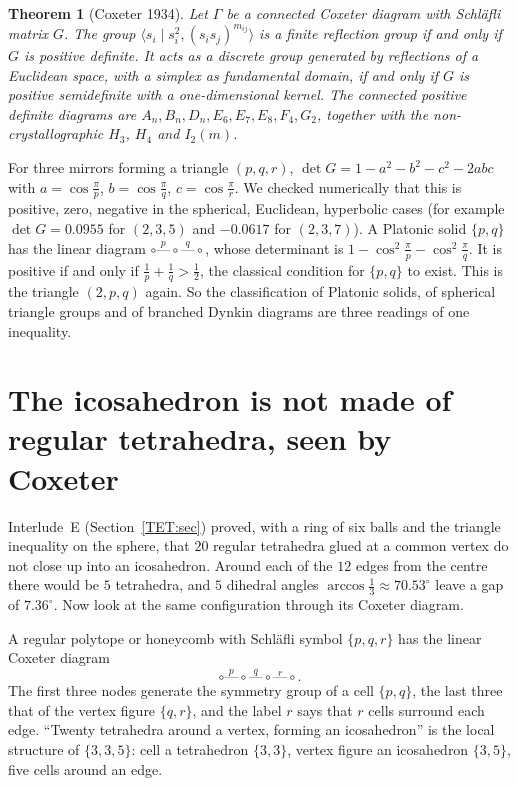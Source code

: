 \documentclass[11pt,openany]{book}
\theoremstyle{plain}
\newtheorem{theorem}{Theorem}[chapter]
\theoremstyle{definition}
\theoremstyle{remark}
\begin{document}
\begin{theorem}[Coxeter 1934]\label{DYN:thm:coxeter}
Let $\Gamma$ be a connected Coxeter diagram with Schl\"afli matrix $G$. The group
$\langle s_i\mid s_i^2,(s_is_j)^{m_{ij}}\rangle$ is a finite reflection group if and only if $G$ is
positive definite. It acts as a discrete group generated by reflections of a Euclidean space, with a
simplex as fundamental domain, if and only if $G$ is positive semidefinite with a one-dimensional kernel.
The connected positive definite diagrams are $A_n,B_n,D_n,E_6,E_7,E_8,F_4,G_2$, together with the
non-crystallographic $H_3$, $H_4$ and $I_2(m)$.
\end{theorem}

For three mirrors forming a triangle $(p,q,r)$,
$\det G=1-a^2-b^2-c^2-2abc$ with $a=\cos\frac\pi p$, $b=\cos\frac\pi q$, $c=\cos\frac\pi r$. We checked
numerically that this is positive, zero, negative in the spherical, Euclidean, hyperbolic cases
(for example $\det G=0.0955$ for $(2,3,5)$ and $-0.0617$ for $(2,3,7)$). A Platonic solid $\{p,q\}$ has
the linear diagram $\circ\overset{p}{\text{---}}\circ\overset{q}{\text{---}}\circ$, whose determinant is
$1-\cos^2\frac\pi p-\cos^2\frac\pi q$. It is positive if and only if
$\frac1p+\frac1q>\frac12$, the classical condition for $\{p,q\}$ to exist. This is the triangle
$(2,p,q)$ again. So the classification of Platonic solids, of spherical triangle groups and of
branched Dynkin diagrams are three readings of one inequality.

\section[The icosahedron, seen by Coxeter]{The icosahedron is not made of regular tetrahedra, seen by Coxeter}
\label{DYN:sec:icosa}

Interlude~E (Section~\ref{TET:sec}) proved, with a ring of six balls and the triangle inequality on
the sphere, that $20$ regular tetrahedra glued at a common vertex do not close up into an icosahedron.
Around each of the $12$ edges from the centre there would be $5$ tetrahedra, and $5$ dihedral angles
$\arccos\frac13\approx70.53^\circ$ leave a gap of $7.36^\circ$. Now look at the same configuration
through its Coxeter diagram.

A regular polytope or honeycomb with Schl\"afli symbol $\{p,q,r\}$ has the linear Coxeter diagram
\[
  \circ\overset{p}{\text{---}}\circ\overset{q}{\text{---}}\circ\overset{r}{\text{---}}\circ .
\]
The first three nodes generate the symmetry group of a cell $\{p,q\}$, the last three that of the vertex
figure $\{q,r\}$, and the label $r$ says that $r$ cells surround each edge. ``Twenty tetrahedra around a
vertex, forming an icosahedron'' is the local structure of $\{3,3,5\}$: cell a tetrahedron $\{3,3\}$,
vertex figure an icosahedron $\{3,5\}$, five cells around an edge.
\end{document}
